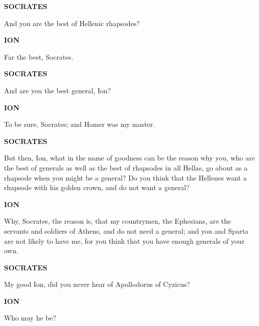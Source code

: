 \documentclass[11pt,letter]{article}
\begin{document}
\par \textbf{SOCRATES}
\par   And you are the best of Hellenic rhapsodes?

\par \textbf{ION}
\par   Far the best, Socrates.

\par \textbf{SOCRATES}
\par   And are you the best general, Ion?

\par \textbf{ION}
\par   To be sure, Socrates; and Homer was my master.

\par \textbf{SOCRATES}
\par   But then, Ion, what in the name of goodness can be the reason why you, who are the best of generals as well as the best of rhapsodes in all Hellas, go about as a rhapsode when you might be a general? Do you think that the Hellenes want a rhapsode with his golden crown, and do not want a general?

\par \textbf{ION}
\par   Why, Socrates, the reason is, that my countrymen, the Ephesians, are the servants and soldiers of Athens, and do not need a general; and you and Sparta are not likely to have me, for you think that you have enough generals of your own.

\par \textbf{SOCRATES}
\par   My good Ion, did you never hear of Apollodorus of Cyzicus?

\par \textbf{ION}
\par   Who may he be?
\end{document}
